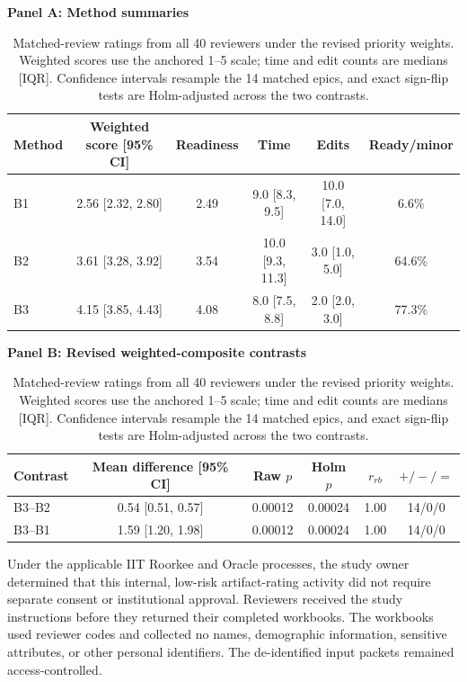 \documentclass[manuscript,review]{acmart}
\begin{document}
\begin{table}[t]
\caption{Matched-review ratings from all 40 reviewers under the revised priority weights. Weighted scores use the anchored 1--5 scale; time and edit counts are medians [IQR]. Confidence intervals resample the 14 matched epics, and exact sign-flip tests are Holm-adjusted across the two contrasts.}
\label{tab:matched-review-results}
\label{tab:matched-review-method-summary}
\label{tab:matched-review-pairwise}
\centering
\small
\textbf{Panel A: Method summaries}\par\smallskip
\begin{tabular}{lccccc}
\toprule
Method & Weighted score [95\% CI] & Readiness & Time & Edits & Ready/minor \\
\midrule
B1 & 2.56 [2.32, 2.80] & 2.49 & 9.0 [8.3, 9.5] & 10.0 [7.0, 14.0] & 6.6\% \\
B2 & 3.61 [3.28, 3.92] & 3.54 & 10.0 [9.3, 11.3] & 3.0 [1.0, 5.0] & 64.6\% \\
B3 & 4.15 [3.85, 4.43] & 4.08 & 8.0 [7.5, 8.8] & 2.0 [2.0, 3.0] & 77.3\% \\
\bottomrule
\end{tabular}

\vspace{0.45em}
\textbf{Panel B: Revised weighted-composite contrasts}\par\smallskip
\begin{tabular}{lccccc}
\toprule
Contrast & Mean difference [95\% CI] & Raw $p$ & Holm $p$ & $r_{rb}$ & $+/-/=$ \\
\midrule
B3--B2 & 0.54 [0.51, 0.57] & 0.00012 & 0.00024 & 1.00 & 14/0/0 \\
B3--B1 & 1.59 [1.20, 1.98] & 0.00012 & 0.00024 & 1.00 & 14/0/0 \\
\bottomrule
\end{tabular}
\end{table}

Under the applicable IIT Roorkee and Oracle processes, the study owner determined that this internal, low-risk artifact-rating activity did not require separate consent or institutional approval. Reviewers received the study instructions before they returned their completed workbooks. The workbooks used reviewer codes and collected no names, demographic information, sensitive attributes, or other personal identifiers. The de-identified input packets remained access-controlled.
\end{document}
